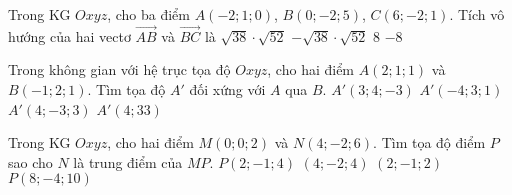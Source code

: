 \begin{ex}%
Trong KG $Oxyz$, cho ba điểm $A(-2; 1; 0)$, $B(0;-2; 5)$, $C(6;-2;1)$. Tích vô hướng của hai vectơ $\overrightarrow{AB}$ và $\overrightarrow{BC}$ là
\choice
{$\sqrt{38}\cdot\sqrt{52}$}
{$-\sqrt{38}\cdot\sqrt{52}$}
{$8$}
{\True $-8$}
\end{ex}


\begin{ex}%
Trong không gian với hệ trục tọa độ $Oxyz$, cho hai điểm $A(2;1;1)$ và $B(-1;2;1)$. Tìm tọa độ $A'$ đối xứng với $A$ qua $B$.
\choice
{$A'(3;4;-3)$}
{\True $A'(-4;3;1)$}
{$A'(4;-3;3)$}
{$A'(4;33)$}
\end{ex}


\begin{ex}%
Trong KG $Oxyz$, cho hai điểm $M(0;0;2)$ và $N(4;-2;6)$. Tìm tọa độ điểm $P$ sao cho $N$ là trung điểm của $MP$.
\choice
{$P(2;-1;4)$}
{$(4;-2;4)$}
{$(2;-1;2)$}
{\True $P(8;-4; 10)$}
\end{ex}


